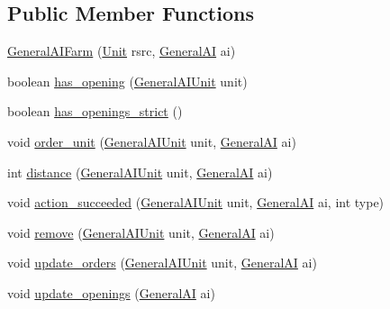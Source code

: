 \subsection*{Public Member Functions}
\begin{DoxyCompactItemize}
\item 
\hyperlink{classai_1_1general_1_1_general_a_i_farm_abb7e9bea4c1cda2335a09690ddc52c9c}{GeneralAIFarm} (\hyperlink{classrts_1_1units_1_1_unit}{Unit} rsrc, \hyperlink{classai_1_1general_1_1_general_a_i}{GeneralAI} ai)
\item 
boolean \hyperlink{classai_1_1general_1_1_general_a_i_farm_a3f118cfbaa003304e47697aab4ef752d}{has\_\-opening} (\hyperlink{classai_1_1general_1_1_general_a_i_unit}{GeneralAIUnit} unit)
\item 
boolean \hyperlink{classai_1_1general_1_1_general_a_i_farm_a71fdd5eb9c3ea81c254e515039e881e7}{has\_\-openings\_\-strict} ()
\item 
void \hyperlink{classai_1_1general_1_1_general_a_i_farm_aa6b6f6dceb9c0eb2ba3384b3910aaf6e}{order\_\-unit} (\hyperlink{classai_1_1general_1_1_general_a_i_unit}{GeneralAIUnit} unit, \hyperlink{classai_1_1general_1_1_general_a_i}{GeneralAI} ai)
\item 
int \hyperlink{classai_1_1general_1_1_general_a_i_farm_a2d9ab033a4a9ef3eb4429726d7141fd8}{distance} (\hyperlink{classai_1_1general_1_1_general_a_i_unit}{GeneralAIUnit} unit, \hyperlink{classai_1_1general_1_1_general_a_i}{GeneralAI} ai)
\item 
void \hyperlink{classai_1_1general_1_1_general_a_i_farm_a1278da6c442be04e8a63e2a7f1dd0015}{action\_\-succeeded} (\hyperlink{classai_1_1general_1_1_general_a_i_unit}{GeneralAIUnit} unit, \hyperlink{classai_1_1general_1_1_general_a_i}{GeneralAI} ai, int type)
\item 
void \hyperlink{classai_1_1general_1_1_general_a_i_farm_a363263e89c3beeef01624e6e29add8b8}{remove} (\hyperlink{classai_1_1general_1_1_general_a_i_unit}{GeneralAIUnit} unit, \hyperlink{classai_1_1general_1_1_general_a_i}{GeneralAI} ai)
\item 
void \hyperlink{classai_1_1general_1_1_general_a_i_farm_a469a9e413a64b67c7f33dc042d0fdb98}{update\_\-orders} (\hyperlink{classai_1_1general_1_1_general_a_i_unit}{GeneralAIUnit} unit, \hyperlink{classai_1_1general_1_1_general_a_i}{GeneralAI} ai)
\item 
void \hyperlink{classai_1_1general_1_1_general_a_i_farm_a889d061a8e646790ec480312882980f0}{update\_\-openings} (\hyperlink{classai_1_1general_1_1_general_a_i}{GeneralAI} ai)
\end{DoxyCompactItemize}
